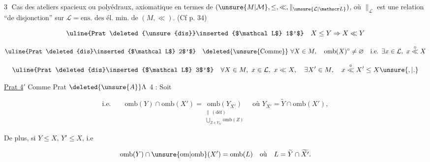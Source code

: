 
\textcircled{3} Cas des ateliers spacieux ou polyédraux, axiomatique en termes de $(\unsure{M|\mathcal M},\leq,\ll,\parallel_{\unsure{\mathcal L|\mathscr L}})$, où $\parallel_{\mathcal L}$ est une relation ``de disjonction'' sur $\mathcal L={}\text{ens. des él. min. de }(M,\ll)$. (Cf p. 34)

\margin{[Prat dis 1 à Prat dis 5 comme Prat $\unsure{\Lambda|\wedge}$ 1 à Prat $\Lambda$ 5, avec $\Lambda=\mathcal L$]}


\[
\text{\uline{Prat \deleted{\unsure{dis}}\inserted{$\mathcal L$} 1$'$}}\quad X\leq Y\Rightarrow X\ll Y
\]

\[
\text{\uline{Prat \deleted{dis}\inserted{$\mathcal L$} 2$'$}}\quad \text{\deleted{\unsure{Comme}} }\forall X\in M,\quad \mathrm{omb}(X)^{\circ}\ne\varnothing\quad \text{i.e. }\exists x\in\mathcal L,\ x\overset{\circ}{\ll}X
\]

\[
\text{\uline{Prat \deleted{dis}\inserted{$\mathcal L$} 3$'$}}\quad \forall X\in M,\ x\in\mathcal L,\ x\ll X,\quad \exists X'\in M,\quad x\overset{\circ}{\ll}X'\leq X\unsure{,|.}
\]

\uline{Prat  4$'$} Comme Prat $\deleted{\unsure{A}}\Lambda$ 4 :  Soit


\[
\text{i.e.}\qquad \mathrm{omb}(Y)\cap\mathrm{omb}(X')=
\underset{\substack{\parallel\,(\mathrm{déf})\\ \displaystyle\bigcup_{Z\in Y_{X'}}\mathrm{omb}(Z)}}{\mathrm{omb}(Y_{X'})}
\quad \text{où }Y_{X'}=\widetilde Y\cap\mathrm{omb}(X'),
\]

De plus, si $Y\leq X$,  $Y'\leq X$, i.e

\[
\mathrm{omb}(Y)\cap\unsure{\mathrm{om}|\mathrm{omb}}(X')=\mathrm{omb}(L)\quad \text{où}\quad L=\widetilde Y\cap\widetilde{X'}.
\]

